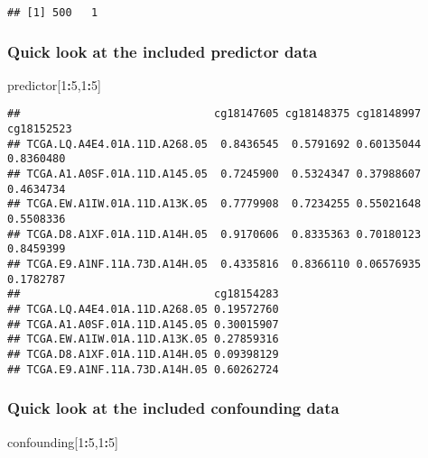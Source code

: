 \documentclass[
]{article}
\newenvironment{Shaded}{\begin{snugshade}}{\end{snugshade}}
\newcommand{\DecValTok}[1]{\textcolor[rgb]{0.00,0.00,0.81}{#1}}
\newcommand{\NormalTok}[1]{#1}
\newcommand{\OperatorTok}[1]{\textcolor[rgb]{0.81,0.36,0.00}{\textbf{#1}}}
\begin{document}
\begin{verbatim}
## [1] 500   1
\end{verbatim}

\hypertarget{quick-look-at-the-included-predictor-data}{%
\subsubsection{Quick look at the included predictor
data}\label{quick-look-at-the-included-predictor-data}}

\begin{Shaded}
\begin{Highlighting}[]
\NormalTok{predictor[}\DecValTok{1}\OperatorTok{:}\DecValTok{5}\NormalTok{,}\DecValTok{1}\OperatorTok{:}\DecValTok{5}\NormalTok{]}
\end{Highlighting}
\end{Shaded}

\begin{verbatim}
##                              cg18147605 cg18148375 cg18148997 cg18152523
## TCGA.LQ.A4E4.01A.11D.A268.05  0.8436545  0.5791692 0.60135044  0.8360480
## TCGA.A1.A0SF.01A.11D.A145.05  0.7245900  0.5324347 0.37988607  0.4634734
## TCGA.EW.A1IW.01A.11D.A13K.05  0.7779908  0.7234255 0.55021648  0.5508336
## TCGA.D8.A1XF.01A.11D.A14H.05  0.9170606  0.8335363 0.70180123  0.8459399
## TCGA.E9.A1NF.11A.73D.A14H.05  0.4335816  0.8366110 0.06576935  0.1782787
##                              cg18154283
## TCGA.LQ.A4E4.01A.11D.A268.05 0.19572760
## TCGA.A1.A0SF.01A.11D.A145.05 0.30015907
## TCGA.EW.A1IW.01A.11D.A13K.05 0.27859316
## TCGA.D8.A1XF.01A.11D.A14H.05 0.09398129
## TCGA.E9.A1NF.11A.73D.A14H.05 0.60262724
\end{verbatim}

\hypertarget{quick-look-at-the-included-confounding-data}{%
\subsubsection{Quick look at the included confounding
data}\label{quick-look-at-the-included-confounding-data}}

\begin{Shaded}
\begin{Highlighting}[]
\NormalTok{confounding[}\DecValTok{1}\OperatorTok{:}\DecValTok{5}\NormalTok{,}\DecValTok{1}\OperatorTok{:}\DecValTok{5}\NormalTok{]}
\end{Highlighting}
\end{Shaded}
\end{document}
